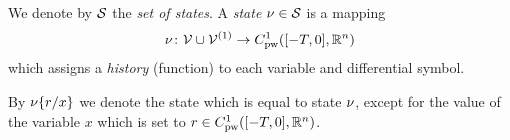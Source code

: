     We denote by $\states$ the \emph{set of states}. A \emph{state} $\asstate\in\states$ is a mapping
    \begin{equation}
        \asstate \from \allvars\cup\diffvars \to \statespace
    \end{equation}
    which assigns a \emph{history} (function) to each variable and differential symbol.

    By $\modif{\asstate}{x}{r}$ we denote the state which is equal to state $\asstate$, except for the value of the variable $x$ which is set to $r\in\statespace$.



